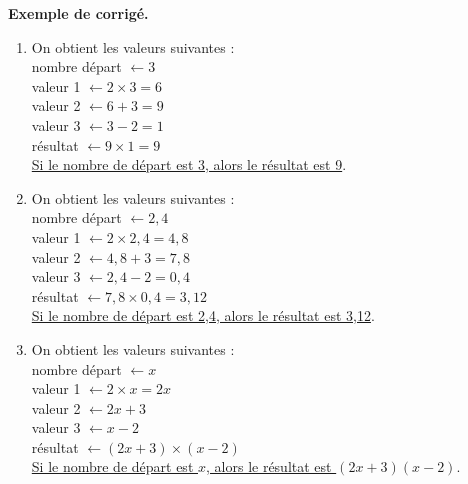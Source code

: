\begin{activite}
   \textcolor{G1}{
   {\bf Exemple de corrigé.} \smallskip
      \begin{enumerate}
         \item On obtient les valeurs suivantes : \\
               nombre départ $\leftarrow 3$ \\
               valeur 1 $\leftarrow2\times3 =6$ \\
               valeur 2 $\leftarrow6+3 =9$ \\
               valeur 3 $\leftarrow3-2 =1$ \\
               résultat $\leftarrow9\times1 =9$ \\
               \uline{Si le nombre de départ est 3, alors le résultat est 9}.
         \item On obtient les valeurs suivantes : \\
               nombre départ $\leftarrow 2,4$ \\
               valeur 1 $\leftarrow2\times2,4 =4,8$ \\
               valeur 2 $\leftarrow4,8+3 =7,8$ \\
               valeur 3 $\leftarrow2,4-2 =0,4$ \\
               résultat $\leftarrow7,8\times0,4 =3,12$ \\
               \uline{Si le nombre de départ est 2,4, alors le résultat est 3,12}.
         \item On obtient les valeurs suivantes : \\
               nombre départ $\leftarrow x$ \\
               valeur 1 $\leftarrow2\times x =2x$ \\
               valeur 2 $\leftarrow2x+3$ \\
               valeur 3 $\leftarrow x-2$ \\
               résultat $\leftarrow(2x+3)\times(x-2)$ \\
               \uline{Si le nombre de départ est $x$, alors le résultat est $(2x+3)(x-2)$}.
      \end{enumerate}}
\end{activite}

\pagebreak


